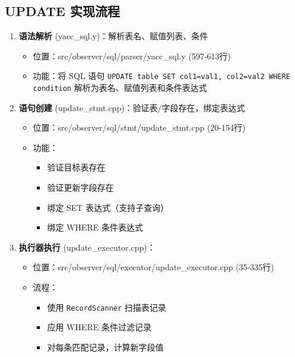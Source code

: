 \documentclass[a4paper, 12pt]{article}
\begin{document}
\subsection{\heiti UPDATE 实现流程}
\begin{enumerate}
    \item \textbf{语法解析} (yacc\_sql.y)：解析表名、赋值列表、条件
    \begin{itemize}
        \item 位置：src/observer/sql/parser/yacc\_sql.y (597-613行)
        \item 功能：将 SQL 语句 \texttt{UPDATE table SET col1=val1, col2=val2 WHERE condition} 解析为表名、赋值列表和条件表达式
    \end{itemize}
    
    \item \textbf{语句创建} (update\_stmt.cpp)：验证表/字段存在，绑定表达式
    
\begin{itemize}
        \item 位置：src/observer/sql/stmt/update\_stmt.cpp (20-154行)
        \item 功能：
        \begin{itemize}
            \item 验证目标表存在
            \item 验证更新字段存在
            \item 绑定 SET 表达式（支持子查询）
            \item 绑定 WHERE 条件表达式
        \end{itemize}
    \end{itemize}
    
    \item \textbf{执行器执行} (update\_executor.cpp)：
    
\begin{itemize}
        \item 位置：src/observer/sql/executor/update\_executor.cpp (35-335行)
        \item 流程：
        \begin{itemize}
            \item 使用 \texttt{RecordScanner} 扫描表记录
            \item 应用 WHERE 条件过滤记录
            \item 对每条匹配记录，计算新字段值
        \end{itemize}
    \end{itemize}
    

\end{enumerate}
\end{document}
